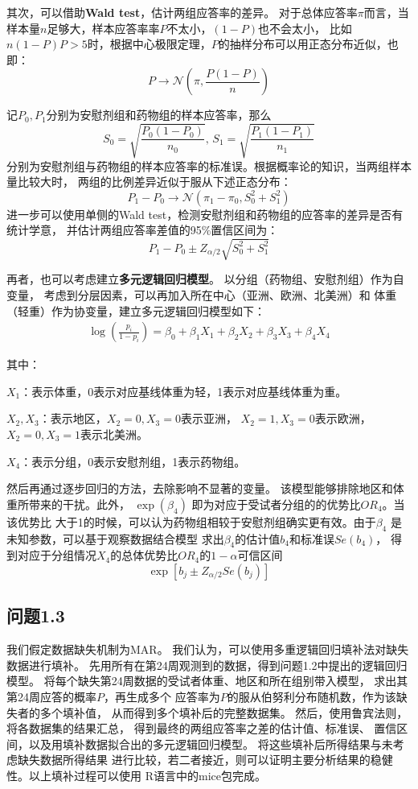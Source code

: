 \documentclass{article}
\begin{document}
其次，可以借助\textbf{Wald test}，估计两组应答率的差异。
对于总体应答率$\pi$而言，当样本量$n$足够大，样本应答率率$P$不太小，$(1-P)$也不会太小，
比如$n(1-P)P>5$时，根据中心极限定理，$P$的抽样分布可以用正态分布近似，也即：
\[P\to \mathcal{N} (\pi,\frac{P(1-P)}{n})\]

记$P_0, P_1$分别为安慰剂组和药物组的样本应答率，那么
\[ S_0 = \sqrt{\frac{P_0(1-P_0)}{n_0}},\, S_1 = \sqrt{\frac{P_1(1-P_1)}{n_1}}\]
分别为安慰剂组与药物组的样本应答率的标准误。根据概率论的知识，当两组样本量比较大时，
两组的比例差异近似于服从下述正态分布：
\[P_1 - P_0 \to \mathcal{N} (\pi_1-\pi_0, S_0^2 + S_1^2)\]
进一步可以使用单侧的Wald test，检测安慰剂组和药物组的应答率的差异是否有统计学意，
并估计两组应答率差值的95$\%$置信区间为：
\[ P_1-P_0 \pm Z_{\alpha/2}\sqrt{ S_0^2 + S_1^2} \]


再者，也可以考虑建立\textbf{多元逻辑回归模型}。
以分组（药物组、安慰剂组）作为自变量，
考虑到分层因素，可以再加入所在中心（亚洲、欧洲、北美洲）和
体重（轻重）作为协变量，建立多元逻辑回归模型如下：
\begin{align*}
    \log\left(\frac{p_i}{1-p_i}\right) =
    \beta_0 + \beta_1 X_1 + \beta_2 X_2 + \beta_3 X_3 + \beta_4 X_4
\end{align*}
\par 其中：
\par $X_1$：表示体重，0表示对应基线体重为轻，1表示对应基线体重为重。
\par $X_2,X_3$：表示地区，$X_2=0,X_3=0$表示亚洲，
    $X_2=1,X_3=0$表示欧洲，$X_2=0,X_3=1$表示北美洲。
\par $X_4$：表示分组，0表示安慰剂组，1表示药物组。

然后再通过逐步回归的方法，去除影响不显著的变量。
该模型能够排除地区和体重所带来的干扰。此外，
$\exp(\beta_4)$ 即为对应于受试者分组的的优势比$OR_4$。当该优势比
大于1的时候，可以认为药物组相较于安慰剂组确实更有效。由于$\beta_4$
是未知参数，可以基于观察数据结合模型
求出$\beta_4$的估计值$b_4$和标准误$Se(b_4)$，
得到对应于分组情况$X_4$的总体优势比$OR_4$的$1-\alpha$可信区间
\[ \exp \left[ b_j \pm Z_{\alpha/2} Se(b_j) \right]\]

\subsection{问题1.3}
我们假定数据缺失机制为MAR。
我们认为，可以使用多重逻辑回归填补法对缺失数据进行填补。
先用所有在第24周观测到的数据，得到问题1.2中提出的逻辑回归模型。
将每个缺失第24周数据的受试者体重、地区和所在组别带入模型，
求出其第24周应答的概率$P$，再生成多个
应答率为$P$的服从伯努利分布随机数，作为该缺失者的多个填补值，
从而得到多个填补后的完整数据集。
然后，使用鲁宾法则，将各数据集的结果汇总，
得到最终的两组应答率之差的估计值、标准误、
置信区间，以及用填补数据拟合出的多元逻辑回归模型。
将这些填补后所得结果与未考虑缺失数据所得结果
进行比较，若二者接近，则可以证明主要分析结果的稳健性。以上填补过程可以使用
R语言中的mice包完成。
\end{document}
